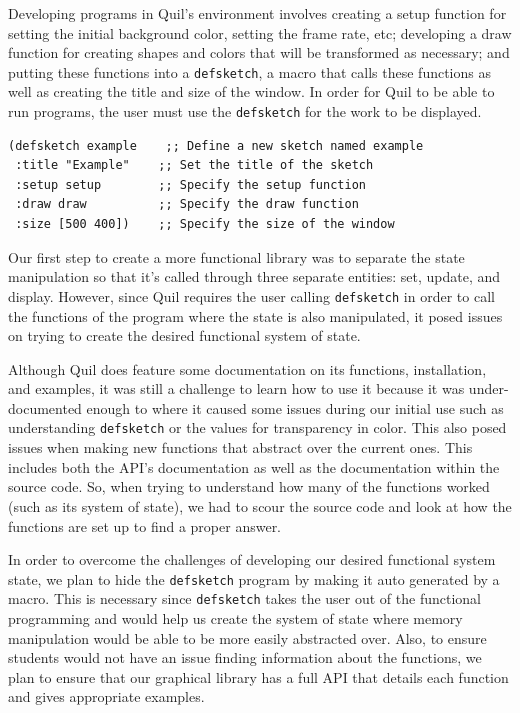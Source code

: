 \documentclass[12pt]{article}
\newcommand{\comment}[1]{{\bf \tt  {#1}}}
\newcommand{\emcomment}[1]{\textcolor{ForestGreen}{\comment{Elena: {#1}}}}
\begin{document}
Developing programs in Quil's environment involves creating a setup function for setting the initial background color, setting the frame rate, etc; developing a draw function for creating shapes and colors that will be transformed as necessary; and putting these functions into a \texttt{defsketch}, a macro that calls these functions as well as creating the title and size of the window. In order for Quil to be able to run programs, the user must use the \texttt{defsketch} for the work to be displayed.
\begin{verbatim}
(defsketch example    ;; Define a new sketch named example
 :title "Example"    ;; Set the title of the sketch
 :setup setup        ;; Specify the setup function
 :draw draw          ;; Specify the draw function
 :size [500 400])    ;; Specify the size of the window
\end{verbatim}
Our first step to create a more functional library was to separate the state manipulation so that it’s called through three separate entities: set, update, and display. However, since Quil requires the user calling \texttt{defsketch} in order to call the functions of the program where the state is also manipulated, it posed issues on trying to create the desired functional system of state. 

Although Quil does feature some documentation on its functions, installation, and examples, it was still a challenge to learn how to use it because it was under-documented enough to where it caused some issues during our initial use such as understanding \texttt{defsketch} or the values for transparency in color.
This also posed issues when making new functions that abstract over the current ones. This includes both the API’s documentation as well as the documentation within the source code. So, when trying to understand how many of the functions worked (such as its system of state), we had to scour the source code and look at how the functions are set up to find a proper answer. 

In order to overcome the challenges of developing our desired functional system state, we plan to hide the \texttt{defsketch} program by making it auto generated by a macro. This is necessary since \texttt{defsketch} takes the user out of the functional programming and would help us create the system of state where memory manipulation would be able to be more easily abstracted over. Also, to ensure students would not have an issue finding information about the functions, we plan to ensure that our graphical library has a full API that details each function and gives appropriate examples. 
\end{document}
